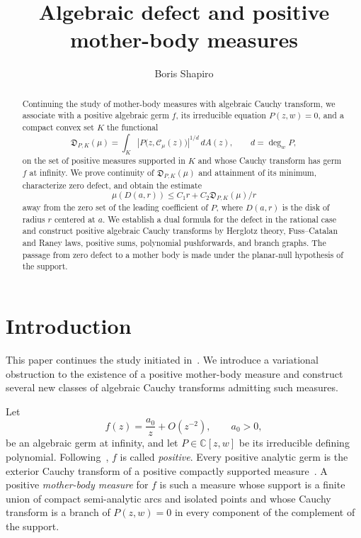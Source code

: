 \documentclass[reqno]{amsart}
\title[Algebraic defect and mother-body measures]{Algebraic defect and positive mother-body measures}
\author{Boris Shapiro}
\date{}
\theoremstyle{definition}
\theoremstyle{remark}
\newcommand{\bC}{\mathbb C}
\newcommand{\Cauchy}{\mathcal C}
\begin{document}
\begin{abstract}
Continuing the study of mother-body measures with algebraic Cauchy transform,
we associate with a positive algebraic germ $f$, its irreducible equation
$P(z,w)=0$, and a compact convex set $K$ the functional
\[
 \mathfrak D_{P,K}(\mu)=
 \int_K\left|P\bigl(z,\Cauchy_\mu(z)\bigr)\right|^{1/d}\,dA(z),
 \qquad d=\deg_wP,
\]
on the set of positive measures supported in $K$ and whose Cauchy transform has germ $f$ at infinity. We prove
continuity of $\mathfrak D_{P,K}(\mu)$ and attainment of its minimum, characterize zero defect, and obtain
the estimate
\[
 \mu(D(a,r))\le C_1r+C_2\mathfrak D_{P,K}(\mu)/r
\]
away from the zero set of the leading coefficient of $P$, where $D(a,r)$ is the disk of radius $r$ centered at $a$.  We establish a
 dual formula for the defect in the rational case and construct positive algebraic Cauchy
transforms by Herglotz theory, Fuss--Catalan and Raney laws, positive sums,
polynomial pushforwards, and branch graphs.  The passage from zero defect to a
mother body is made under the planar-null hypothesis of the  support.
\end{abstract}



\maketitle

\section{Introduction}

This paper continues the study initiated in~\cite{BoSh}. 
We introduce a variational obstruction to the existence of a positive
mother-body measure and construct several new classes of algebraic Cauchy
transforms admitting such measures.

Let
\[
 f(z)=\frac{a_0}{z}+O(z^{-2}),\qquad a_0>0,
\]
be an algebraic germ at infinity, and let $P\in\bC[z,w]$ be its irreducible
defining polynomial.  Following~\cite{BoSh}, $f$ is called \emph{positive}.  Every
positive analytic germ is the exterior Cauchy transform of a positive compactly
supported measure~\cite[Theorem~1]{BoSh}.  A positive \emph{mother-body measure}
for $f$ is such a measure whose support is a finite union of compact
semi-analytic arcs and isolated points and whose Cauchy transform is a branch of
$P(z,w)=0$ in every component of the complement of the support.
\end{document}
